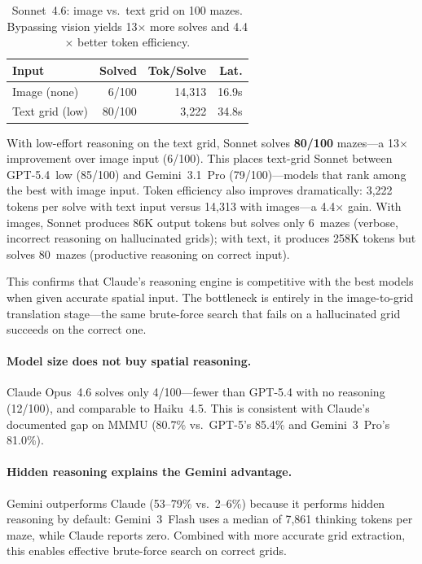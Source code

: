 \documentclass[11pt]{article}
\begin{document}
\begin{table}[t]
\centering
\small
\begin{tabular}{@{}lrrr@{}}
\toprule
\textbf{Input} & \textbf{Solved} & \textbf{Tok/Solve} & \textbf{Lat.} \\
\midrule
Image (none)    &  6/100 & 14,313 & 16.9s \\
Text grid (low) & 80/100 &  3,222 & 34.8s \\
\bottomrule
\end{tabular}
\caption{Sonnet~4.6: image vs.\ text grid on 100 mazes. Bypassing vision yields 13$\times$ more solves and 4.4$\times$ better token efficiency.}
\label{tab:textgrid}
\end{table}

With low-effort reasoning on the text grid, Sonnet solves \textbf{80/100} mazes---a 13$\times$ improvement over image input (6/100).
This places text-grid Sonnet between GPT-5.4~low (85/100) and Gemini~3.1~Pro (79/100)---models that rank among the best with image input.
Token efficiency also improves dramatically: 3,222 tokens per solve with text input versus 14,313 with images---a 4.4$\times$ gain.
With images, Sonnet produces 86K output tokens but solves only 6~mazes (verbose, incorrect reasoning on hallucinated grids); with text, it produces 258K tokens but solves 80~mazes (productive reasoning on correct input).

This confirms that Claude's reasoning engine is competitive with the best models when given accurate spatial input.
The bottleneck is entirely in the image-to-grid translation stage---the same brute-force search that fails on a hallucinated grid succeeds on the correct one.
\label{sec:textgrid}

\paragraph{Model size does not buy spatial reasoning.}
Claude Opus~4.6 solves only 4/100---fewer than GPT-5.4 with no reasoning (12/100), and comparable to Haiku~4.5.
This is consistent with Claude's documented gap on MMMU \cite{yue2024mmmu} (80.7\% vs.\ GPT-5's 85.4\% and Gemini~3~Pro's 81.0\%).

\paragraph{Hidden reasoning explains the Gemini advantage.}
Gemini outperforms Claude (53--79\% vs.\ 2--6\%) because it performs hidden reasoning by default: Gemini~3~Flash uses a median of 7,861 thinking tokens per maze, while Claude reports zero.
Combined with more accurate grid extraction, this enables effective brute-force search on correct grids.
\end{document}
